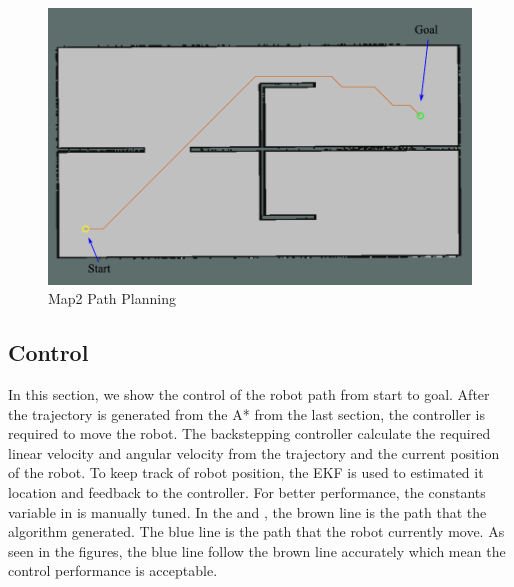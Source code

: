 \begin{figure}[H]
	\centering
	\includegraphics[scale=0.80]{images/imagess/7reslt-pp-map2.pdf}
	\caption{Map2 Path Planning}
	\label{fig:Map2 Path Planning}
\end{figure}




\subsection{Control}
\hspace{1.27cm}
In this section, we show the control of the robot path from start to goal. After the trajectory is generated from the A* from the last section, the controller is required to move the robot. The backstepping controller calculate the required linear velocity and angular velocity from the trajectory and the current position of the robot. To keep track of robot position, the EKF is used to estimated it location and feedback to the controller. For better performance, the constants variable in \textbf{\tableautorefname{ \ref{Table: Simulation Parameters}}} is manually tuned. In the \textbf{\figureautorefname{ \ref{fig:Map1 Control}}} and \textbf{\figureautorefname{ \ref{fig:Map2 Control}}}, the brown line is the path that the algorithm generated. The blue line is the path that the robot currently move. As seen in the figures, the blue line follow the brown line accurately which mean the control performance is acceptable.\par


